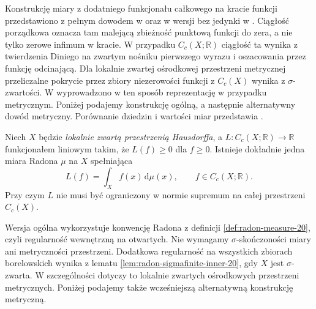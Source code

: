 Konstrukcję miary z dodatniego funkcjonału całkowego
na kracie funkcji przedstawiono z pełnym dowodem w
oraz w wersji bez jedynki w
.
Ciągłość porządkowa oznacza tam malejącą zbieżność
punktową funkcji do zera, a nie tylko zerowe infimum
w kracie. W przypadku $C_c(X;\mathbb R)$ ciągłość ta
wynika z twierdzenia Diniego na zwartym nośniku
pierwszego wyrazu i oszacowania przez funkcję odcinającą.
Dla lokalnie zwartej ośrodkowej przestrzeni metrycznej
przeliczalne pokrycie przez zbiory niezerowości funkcji
z $C_c(X)$ wynika z $\sigma$-zwartości.
W 
wyprowadzono w ten sposób reprezentację w przypadku metrycznym.
Poniżej podajemy konstrukcję ogólną, a następnie alternatywny
dowód metryczny. Porównanie dziedzin i wartości miar przedstawia
.

\begin{twierdzenie}
\label{thm:riesz-positive-21}
Niech $X$ będzie \emph{lokalnie zwartą przestrzenią Hausdorffa}, a $L:C_c(X;\mathbb R)\to\mathbb R$ funkcjonałem
liniowym takim, że $L(f)\ge0$ dla $f\ge0$.
Istnieje dokładnie jedna miara Radona $\mu$ na $X$ spełniająca
\begin{equation}\label{eq:riesz-representation-21}
 L(f)=\int_X f(x)\,\mathrm d\mu(x),\qquad f\in C_c(X;\mathbb R).
\end{equation}
Przy czym $L$ nie musi być ograniczony w normie supremum na
całej przestrzeni $C_c(X)$.
\end{twierdzenie}

\begin{uwaga}
Wersja ogólna wykorzystuje konwencję Radona z definicji \ref{def:radon-measure-20}, czyli regularność wewnętrzną na otwartych. Nie wymagamy $\sigma$-skończoności miary ani metryczności przestrzeni. Dodatkowa regularność na wszystkich zbiorach borelowskich wynika z lematu \ref{lem:radon-sigmafinite-inner-20}, gdy $X$ jest $\sigma$-zwarta. W szczególności dotyczy to lokalnie zwartych ośrodkowych przestrzeni metrycznych. Poniżej podajemy także wcześniejszą alternatywną konstrukcję metryczną.
\end{uwaga}

